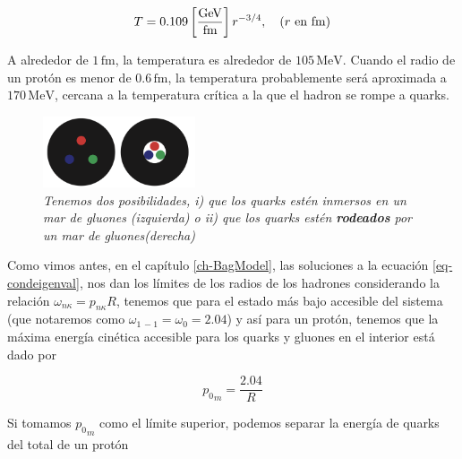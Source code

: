 \begin{equation}\label{eq-T(r)}
T = 0.109\left[ \frac{\unit{GeV}}{\unit{\femto\meter}}\right] {r}^{-3/4}, \quad (r  \text{ en \unit{\femto\meter}})
\end{equation}

A alrededor de $1 \, \mathrm{\unit{\femto\meter}}$, la temperatura es alrededor de $105 \, \mathrm{MeV}$. Cuando el radio de un protón es menor de $0.6 \, \mathrm{\unit{\femto\meter}}$, la temperatura probablemente será aproximada a $170 \, \mathrm{MeV}$, cercana a la temperatura crítica a la que el hadron se rompe a quarks.

\begin{figure}
\centering
\includegraphics[width=0.4\textwidth]{./Images/Bag model-two scenaries.png}
\caption[Posibles estructuras del modelo de bolsa]{
 \emph{Tenemos dos posibilidades, i) que los quarks estén inmersos en un mar de gluones (izquierda) o ii) que los quarks estén \textbf{rodeados} \allowbreak por un mar de gluones(derecha)}}
\label{fig: 2Bag-models}
\end{figure}


Como vimos antes, en el capítulo \ref{ch-BagModel}, las soluciones a la ecuación \eqref{eq-condeigenval}, nos dan los límites de los radios de los hadrones considerando la relación ${\omega}_{n\kappa} = {p}_{n\kappa}{R}$, tenemos que para el estado más bajo accesible del sistema (que notaremos como ${\omega}_{1 \, -1} = {\omega}_{0} = 2.04$) y así para un protón, tenemos que la máxima energía cinética accesible para los quarks y gluones en el interior está dado por

\begin{equation}\label{eq-maxp}
{{p}_{0}}_{m} = \frac{2.04}{R}
\end{equation}

Si tomamos ${{p}_{0}}_{m}$ como el límite superior, podemos separar la energía de quarks del total de un protón

